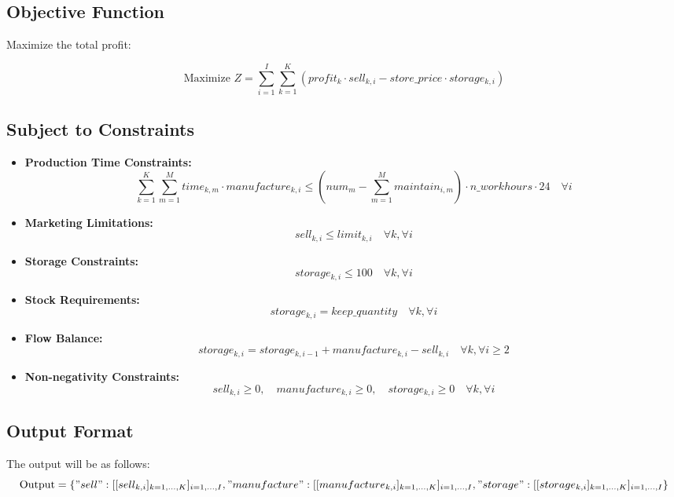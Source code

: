 \documentclass{article}
\begin{document}
\subsection*{Objective Function}
Maximize the total profit:

\[
\text{Maximize } Z = \sum_{i=1}^{I} \sum_{k=1}^{K} \left( profit_{k} \cdot sell_{k,i} - store\_price \cdot storage_{k,i} \right)
\]

\subsection*{Subject to Constraints}

\begin{itemize}

\item \textbf{Production Time Constraints:}
\[
\sum_{k=1}^{K} \sum_{m=1}^{M} time_{k,m} \cdot manufacture_{k,i} \leq (num_{m} - \sum_{m=1}^{M} maintain_{i,m}) \cdot n\_workhours \cdot 24 \quad \forall i
\]

\item \textbf{Marketing Limitations:}
\[
sell_{k,i} \leq limit_{k,i} \quad \forall k, \forall i
\]

\item \textbf{Storage Constraints:}
\[
storage_{k,i} \leq 100 \quad \forall k, \forall i
\]

\item \textbf{Stock Requirements:}
\[
storage_{k,i} = keep\_quantity \quad \forall k, \forall i
\]

\item \textbf{Flow Balance:}
\[
storage_{k,i} = storage_{k,i-1} + manufacture_{k,i} - sell_{k,i} \quad \forall k, \forall i \geq 2
\]

\item \textbf{Non-negativity Constraints:}
\[
sell_{k,i} \geq 0, \quad manufacture_{k,i} \geq 0, \quad storage_{k,i} \geq 0 \quad \forall k, \forall i
\]

\end{itemize}

\subsection*{Output Format}
The output will be as follows:
\[
\text{Output} = \{
    "sell": [[sell_{k,i}]_{k=1,...,K}]_{i=1,...,I},
    "manufacture": [[manufacture_{k,i}]_{k=1,...,K}]_{i=1,...,I},
    "storage": [[storage_{k,i}]_{k=1,...,K}]_{i=1,...,I}
\}
\]
\end{document}

